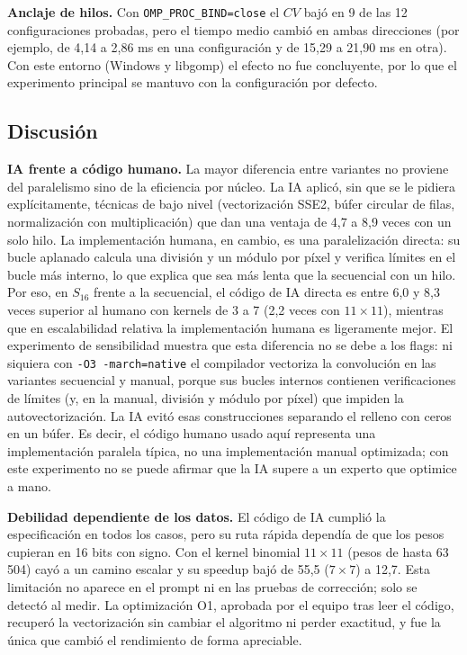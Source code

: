 \documentclass[12pt]{article}
\begin{document}
\textbf{Anclaje de hilos.} Con \texttt{OMP\_PROC\_BIND=close} el $CV$ bajó en 9 de las 12 configuraciones probadas, pero el tiempo medio cambió en ambas direcciones (por ejemplo, de 4,14 a 2,86 ms en una configuración y de 15,29 a 21,90 ms en otra). Con este entorno (Windows y libgomp) el efecto no fue concluyente, por lo que el experimento principal se mantuvo con la configuración por defecto.

\subsection{Discusión}
\textbf{IA frente a código humano.} La mayor diferencia entre variantes no proviene del paralelismo sino de la eficiencia por núcleo. La IA aplicó, sin que se le pidiera explícitamente, técnicas de bajo nivel (vectorización SSE2, búfer circular de filas, normalización con multiplicación) que dan una ventaja de 4,7 a 8,9 veces con un solo hilo. La implementación humana, en cambio, es una paralelización directa: su bucle aplanado calcula una división y un módulo por píxel y verifica límites en el bucle más interno, lo que explica que sea más lenta que la secuencial con un hilo. Por eso, en $S_{16}$ frente a la secuencial, el código de IA directa es entre 6,0 y 8,3 veces superior al humano con kernels de 3 a 7 (2,2 veces con $11\times11$), mientras que en escalabilidad relativa la implementación humana es ligeramente mejor. El experimento de sensibilidad muestra que esta diferencia no se debe a los flags: ni siquiera con \texttt{-O3 -march=native} el compilador vectoriza la convolución en las variantes secuencial y manual, porque sus bucles internos contienen verificaciones de límites (y, en la manual, división y módulo por píxel) que impiden la autovectorización. La IA evitó esas construcciones separando el relleno con ceros en un búfer. Es decir, el código humano usado aquí representa una implementación paralela típica, no una implementación manual optimizada; con este experimento no se puede afirmar que la IA supere a un experto que optimice a mano.

\textbf{Debilidad dependiente de los datos.} El código de IA cumplió la especificación en todos los casos, pero su ruta rápida dependía de que los pesos cupieran en 16 bits con signo. Con el kernel binomial $11\times11$ (pesos de hasta 63\,504) cayó a un camino escalar y su speedup bajó de 55,5 ($7\times7$) a 12,7. Esta limitación no aparece en el prompt ni en las pruebas de corrección; solo se detectó al medir. La optimización O1, aprobada por el equipo tras leer el código, recuperó la vectorización sin cambiar el algoritmo ni perder exactitud, y fue la única que cambió el rendimiento de forma apreciable.
\end{document}
